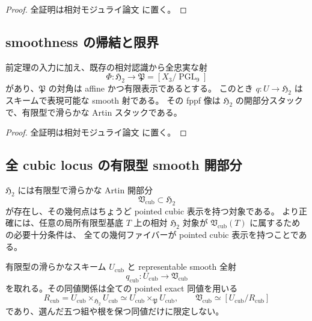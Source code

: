 \begin{proof}
全証明は相対モジュライ論文 \cite[\texttt{cubic_smooth_atlas}]{QuadricModuli2026} に置く。
\end{proof}

\subsection{smoothness の帰結と限界}

\begin{corollary}
\label{cor:quintuple-effective-smooth-chart}
前定理の入力に加え、既存の相対認識から全忠実な射
\[
 \Phi:\mathfrak H_2\longrightarrow\mathfrak P=[X_3/\operatorname{PGL}_9]
\]
があり、$\mathfrak P$ の対角は affine かつ有限表示であるとする。
このとき $q:U\to\mathfrak H_2$ はスキームで表現可能な smooth 射である。
その fppf 像は $\mathfrak H_2$ の開部分スタックで、有限型で滑らかな Artin スタックである。
\end{corollary}

\begin{proof}
全証明は相対モジュライ論文 \cite[\texttt{cubic_smooth_atlas}]{QuadricModuli2026} に置く。
\end{proof}

\subsection{全 cubic locus の有限型 smooth 開部分}

\begin{theorem}
\label{thm:cubic-smooth-open}
$\mathfrak H_2$ には有限型で滑らかな Artin 開部分
\[
 \mathfrak V_{\mathrm{cub}}\subset\mathfrak H_2
\]
が存在し、その幾何点はちょうど pointed cubic 表示を持つ対象である。
より正確には、任意の局所有限型基底 $T$ 上の相対 $\mathfrak H_2$ 対象が
$\mathfrak V_{\mathrm{cub}}(T)$ に属するための必要十分条件は、
全ての幾何ファイバーが pointed cubic 表示を持つことである。

有限型の滑らかなスキーム $U_{\mathrm{cub}}$ と representable smooth 全射
\[
 q_{\mathrm{cub}}:U_{\mathrm{cub}}\longrightarrow\mathfrak V_{\mathrm{cub}}
\]
を取れる。その同値関係は全ての pointed exact 同値を用いる
\[
 R_{\mathrm{cub}}=U_{\mathrm{cub}}\times_{\mathfrak H_2}U_{\mathrm{cub}}
 \simeq U_{\mathrm{cub}}\times_{\mathfrak P}U_{\mathrm{cub}},\qquad
 \mathfrak V_{\mathrm{cub}}\simeq[U_{\mathrm{cub}}/R_{\mathrm{cub}}]
\]
であり、選んだ五つ組や根を保つ同値だけに限定しない。
\end{theorem}

